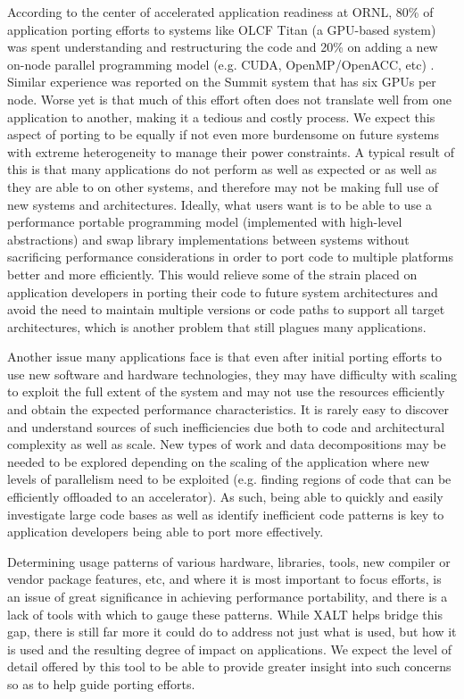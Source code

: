 According to the center of accelerated application readiness at \acs{ORNL}, 80\% of application porting efforts 
to systems like OLCF Titan (a \acs{GPU}-based system) was spent understanding and restructuring the code and 20\% on 
adding a new on-node parallel programming model (e.g. CUDA, OpenMP/OpenACC, etc) \cite{titan}. Similar experience was reported on the Summit system that has six \acsp{GPU} per node.  
Worse yet is that much of this effort often does not translate well from one application to another, making it a 
tedious and costly process.
We expect this aspect of porting to be equally if not even more burdensome on future systems with extreme heterogeneity to manage their power constraints.  A typical result of this is that many applications do not perform as well as expected or as well as they are able 
to on other systems, and therefore may not be making full use of new systems and architectures.
Ideally, what users want is to be able to use a performance portable programming model (implemented with high-level abstractions) and swap library implementations between systems without 
sacrificing performance considerations in order to port code to multiple platforms better and more efficiently.
This would relieve some of the strain placed on application developers in porting their code to 
future system architectures and avoid the need to maintain multiple versions or code paths to support all target architectures, 
which is another problem that still plagues many applications.

Another issue many applications face is that even after initial porting efforts to use new software and hardware 
technologies, they may have difficulty with scaling to exploit the full extent of the system and may not use the 
resources efficiently and obtain the expected performance characteristics.
It is rarely easy to discover and understand sources of such inefficiencies due both to code and architectural 
complexity as well as scale. New types of work and data decompositions may be needed to be explored depending on the scaling of the application where new levels of parallelism need to be exploited (e.g. finding regions of code that can be efficiently offloaded to an accelerator). As such, being able to quickly and easily investigate large code bases as well as identify inefficient code 
patterns is key to application developers being able to port more effectively.

Determining usage patterns of various hardware, libraries, tools, new compiler or vendor package features, 
etc, and where it is most important to focus efforts, is an issue of great significance in achieving performance 
portability, and there is a lack of tools with which to gauge these patterns.
While XALT helps bridge this gap, there is still far more it could do to address not just what is used, but how it 
is used and the resulting degree of impact on applications.
We expect the level of detail offered by this tool to be able to provide greater insight into such concerns so as 
to help guide porting efforts.

